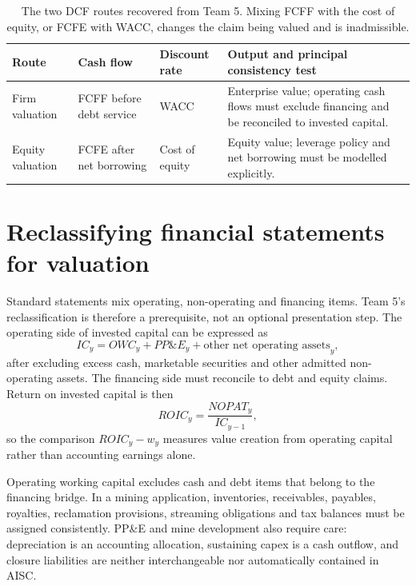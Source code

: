 \begin{table}[H]
\centering
\small
\begin{tabularx}{\textwidth}{@{}p{2.7cm}p{3.0cm}p{2.8cm}X@{}}
\toprule
Route & Cash flow & Discount rate & Output and principal consistency test \\
\midrule
Firm valuation & FCFF before debt service & WACC & Enterprise value; operating
cash flows must exclude financing and be reconciled to invested capital. \\
Equity valuation & FCFE after net borrowing & Cost of equity & Equity value;
leverage policy and net borrowing must be modelled explicitly. \\
\bottomrule
\end{tabularx}
\caption{The two DCF routes recovered from Team 5. Mixing FCFF with the cost of
equity, or FCFE with WACC, changes the claim being valued and is inadmissible.}
\label{tab:dcf-route-consistency}
\end{table}

\section{Reclassifying financial statements for valuation}

Standard statements mix operating, non-operating and financing items. Team 5's
reclassification is therefore a prerequisite, not an optional presentation
step. The operating side of invested capital can be expressed as
\begin{equation}
IC_y=OWC_y+PP\&E_y+\text{other net operating assets}_y,
\end{equation}
after excluding excess cash, marketable securities and other admitted
non-operating assets. The financing side must reconcile to debt and equity
claims. Return on invested capital is then
\begin{equation}
ROIC_y=\frac{NOPAT_y}{IC_{y-1}},
\end{equation}
so the comparison \(ROIC_y-w_y\) measures value creation from operating
capital rather than accounting earnings alone.

Operating working capital excludes cash and debt items that belong to the
financing bridge. In a mining application, inventories, receivables, payables,
royalties, reclamation provisions, streaming obligations and tax balances
must be assigned consistently. PP\&E and mine development also require care:
depreciation is an accounting allocation, sustaining capex is a cash outflow,
and closure liabilities are neither interchangeable nor automatically
contained in AISC.

